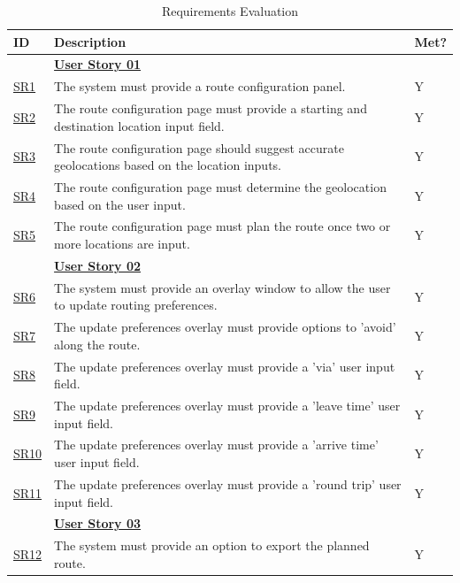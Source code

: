 \begingroup
\setlength{\tabcolsep}{10pt} %
\renewcommand{\arraystretch}{1.5} %
\begin{table}[!htb]
\caption{Requirements Evaluation}
\label{evaluatedrq}
\small
    \begin{tabularx}{\textwidth}{ p{1cm} p{11cm} p{1cm} }
        \hline
        ID & Description & Met? \\ 
        \hline
        & \textbf{\hyperref[tab:user-story-01]{User Story 01}} \\
        \hyperref[SR:1]{SR1} & The system must provide a route configuration panel. & Y\\
        \hyperref[SR:2]{SR2} & The route configuration page must provide a starting and destination location input field. & Y\\
        \hyperref[SR:3]{SR3} & The route configuration page should suggest accurate geolocations based on the location inputs.  & Y\\
        \hyperref[SR:4]{SR4} & The route configuration page must determine the geolocation based on the user input. & Y\\
        \hyperref[SR:5]{SR5} & The route configuration page must plan the route once two or more locations are input. & Y\\
        \hline
        & \textbf{\hyperref[tab:user-story-02]{User Story 02}}  \\
        \hyperref[SR:6]{SR6} & The system must provide an overlay window to allow the user to update routing preferences. & Y\\
        \hyperref[SR:7]{SR7} & The update preferences overlay must provide options to 'avoid' along the route. & Y\\
        \hyperref[SR:8]{SR8} & The update preferences overlay must provide a 'via' user input field. & Y\\ 
        \hyperref[SR:9]{SR9} & The update preferences overlay must provide a 'leave time' user input field. & Y\\ 
        \hyperref[SR:10]{SR10} & The update preferences overlay must provide a 'arrive time' user input field. & Y\\ 
        \hyperref[SR:11]{SR11} & The update preferences overlay must provide a 'round trip' user input field. & Y\\ 
        \hline
        & \textbf{\hyperref[tab:user-story-03]{User Story 03}}  \\
        \hyperref[SR:12]{SR12} & The system must provide an option to export the planned route. & Y \\

\end{tabularx}
\end{table}
